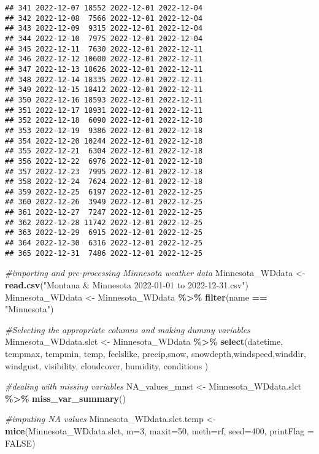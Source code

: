 \documentclass[
]{article}
\newenvironment{Shaded}{\begin{snugshade}}{\end{snugshade}}
\newcommand{\AttributeTok}[1]{\textcolor[rgb]{0.13,0.29,0.53}{#1}}
\newcommand{\CommentTok}[1]{\textcolor[rgb]{0.56,0.35,0.01}{\textit{#1}}}
\newcommand{\ConstantTok}[1]{\textcolor[rgb]{0.56,0.35,0.01}{#1}}
\newcommand{\DecValTok}[1]{\textcolor[rgb]{0.00,0.00,0.81}{#1}}
\newcommand{\FunctionTok}[1]{\textcolor[rgb]{0.13,0.29,0.53}{\textbf{#1}}}
\newcommand{\NormalTok}[1]{#1}
\newcommand{\OtherTok}[1]{\textcolor[rgb]{0.56,0.35,0.01}{#1}}
\newcommand{\SpecialCharTok}[1]{\textcolor[rgb]{0.81,0.36,0.00}{\textbf{#1}}}
\newcommand{\StringTok}[1]{\textcolor[rgb]{0.31,0.60,0.02}{#1}}
\begin{document}
\begin{verbatim}
## 341 2022-12-07 18552 2022-12-01 2022-12-04
## 342 2022-12-08  7566 2022-12-01 2022-12-04
## 343 2022-12-09  9315 2022-12-01 2022-12-04
## 344 2022-12-10  7975 2022-12-01 2022-12-04
## 345 2022-12-11  7630 2022-12-01 2022-12-11
## 346 2022-12-12 10600 2022-12-01 2022-12-11
## 347 2022-12-13 18626 2022-12-01 2022-12-11
## 348 2022-12-14 18335 2022-12-01 2022-12-11
## 349 2022-12-15 18412 2022-12-01 2022-12-11
## 350 2022-12-16 18593 2022-12-01 2022-12-11
## 351 2022-12-17 18931 2022-12-01 2022-12-11
## 352 2022-12-18  6090 2022-12-01 2022-12-18
## 353 2022-12-19  9386 2022-12-01 2022-12-18
## 354 2022-12-20 10244 2022-12-01 2022-12-18
## 355 2022-12-21  6304 2022-12-01 2022-12-18
## 356 2022-12-22  6976 2022-12-01 2022-12-18
## 357 2022-12-23  7995 2022-12-01 2022-12-18
## 358 2022-12-24  7624 2022-12-01 2022-12-18
## 359 2022-12-25  6197 2022-12-01 2022-12-25
## 360 2022-12-26  3949 2022-12-01 2022-12-25
## 361 2022-12-27  7247 2022-12-01 2022-12-25
## 362 2022-12-28 11742 2022-12-01 2022-12-25
## 363 2022-12-29  6915 2022-12-01 2022-12-25
## 364 2022-12-30  6316 2022-12-01 2022-12-25
## 365 2022-12-31  7486 2022-12-01 2022-12-25
\end{verbatim}

\begin{Shaded}
\begin{Highlighting}[]
\CommentTok{\#importing and pre{-}processing Minnesota weather data }
\NormalTok{Minnesota\_WDdata }\OtherTok{\textless{}{-}} \FunctionTok{read.csv}\NormalTok{(}\StringTok{"Montana \& Minnesota 2022{-}01{-}01 to 2022{-}12{-}31.csv"}\NormalTok{)}
\NormalTok{Minnesota\_WDdata }\OtherTok{\textless{}{-}}\NormalTok{  Minnesota\_WDdata }\SpecialCharTok{\%\textgreater{}\%}
  \FunctionTok{filter}\NormalTok{(name }\SpecialCharTok{==} \StringTok{"Minnesota"}\NormalTok{)}

\CommentTok{\#Selecting the appropriate columns and making dummy variables }
\NormalTok{Minnesota\_WDdata.slct }\OtherTok{\textless{}{-}}\NormalTok{ Minnesota\_WDdata }\SpecialCharTok{\%\textgreater{}\%}
  \FunctionTok{select}\NormalTok{(datetime, tempmax, tempmin, temp, }
\NormalTok{          feelslike, precip,snow, snowdepth,windspeed,winddir, }
\NormalTok{          windgust, visibility, cloudcover, humidity, conditions )}

\CommentTok{\#dealing with missing variables}
\NormalTok{NA\_values\_mnst }\OtherTok{\textless{}{-}}\NormalTok{ Minnesota\_WDdata.slct }\SpecialCharTok{\%\textgreater{}\%}
  \FunctionTok{miss\_var\_summary}\NormalTok{()}

\CommentTok{\#imputing NA values}
\NormalTok{Minnesota\_WDdata.slct.temp }\OtherTok{\textless{}{-}} \FunctionTok{mice}\NormalTok{(Minnesota\_WDdata.slct,}
                                   \AttributeTok{m=}\DecValTok{3}\NormalTok{, }
                                   \AttributeTok{maxit=}\DecValTok{50}\NormalTok{, }
                                   \AttributeTok{meth=}\StringTok{\textquotesingle{}rf\textquotesingle{}}\NormalTok{, }
                                   \AttributeTok{seed=}\DecValTok{400}\NormalTok{, }
                                   \AttributeTok{printFlag =} \ConstantTok{FALSE}\NormalTok{)}
\end{Highlighting}
\end{Shaded}
\end{document}
